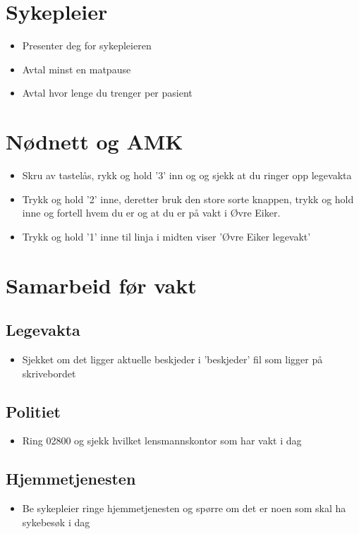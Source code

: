 \documentclass[12pt,a4paper]{memoir}
\begin{document}
	\section{Sykepleier}\label{sec:start_sykepleier}
		\begin{itemize}
			\item Presenter deg for sykepleieren
			\item Avtal minst en matpause
			\item Avtal hvor lenge du trenger per pasient
		\end{itemize}
	\section{Nødnett og AMK}\label{sec:start_AMK}
		\begin{itemize}
			\item Skru av tastelås, rykk og hold '3' inn og og sjekk at du ringer opp legevakta
			\item Trykk og hold '2' inne, deretter bruk den store sorte knappen, trykk og hold inne og fortell hvem du er og at du er på vakt i Øvre Eiker.
			\item Trykk og hold '1' inne til linja i midten viser 'Øvre Eiker legevakt'
		\end{itemize}
	\section{Samarbeid før vakt}\label{sec:start_samarbeid}
		\subsection{Legevakta}\label{sec:sam_lvintern}
			\begin{itemize}
				\item Sjekket om det ligger aktuelle beskjeder i 'beskjeder' fil som ligger på skrivebordet
			\end{itemize}
		\subsection{Politiet}\label{sec:sam_pol}%
			\begin{itemize}
				\item Ring 02800 og sjekk hvilket lensmannskontor som har vakt i dag
			\end{itemize}
		\subsection{Hjemmetjenesten}\label{sec:sam_hjtj}%
			\begin{itemize}
				\item Be sykepleier ringe hjemmetjenesten og spørre om det er noen som skal ha sykebesøk i dag
		\end{itemize}
		\label{lst:start_kontor_num}
\newpage
\end{document}

